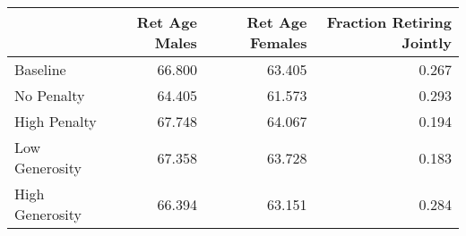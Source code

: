 \begin{tabular}{lrrr}
\toprule
{} & Ret Age Males & Ret Age Females & Fraction Retiring Jointly \\
\midrule
Baseline        &        66.800 &          63.405 &                     0.267 \\
No Penalty      &        64.405 &          61.573 &                     0.293 \\
High Penalty    &        67.748 &          64.067 &                     0.194 \\
Low Generosity  &        67.358 &          63.728 &                     0.183 \\
High Generosity &        66.394 &          63.151 &                     0.284 \\
\bottomrule
\end{tabular}
